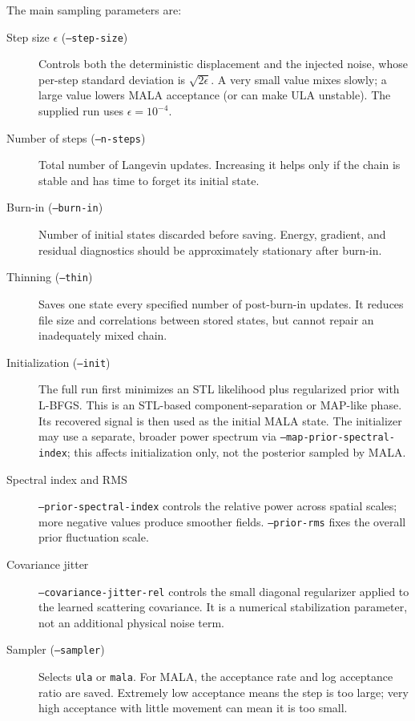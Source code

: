 \documentclass[11pt]{article}
\begin{document}
The main sampling parameters are:
\begin{description}
    \item[Step size $\epsilon$ (\texttt{--step-size})]
    Controls both the deterministic displacement and the injected noise,
    whose per-step standard deviation is $\sqrt{2\epsilon}$.  A very small
    value mixes slowly; a large value lowers MALA acceptance (or can make ULA
    unstable).  The supplied run uses $\epsilon=10^{-4}$.

    \item[Number of steps (\texttt{--n-steps})]
    Total number of Langevin updates.  Increasing it helps only if the chain is
    stable and has time to forget its initial state.

    \item[Burn-in (\texttt{--burn-in})]
    Number of initial states discarded before saving.  Energy, gradient, and
    residual diagnostics should be approximately stationary after burn-in.

    \item[Thinning (\texttt{--thin})]
    Saves one state every specified number of post-burn-in updates.  It reduces
    file size and correlations between stored states, but cannot repair an
    inadequately mixed chain.

    \item[Initialization (\texttt{--init})]
    The full run first minimizes an STL likelihood plus regularized prior with
    L-BFGS.  This is an STL-based component-separation or MAP-like phase.  Its recovered
    signal is then used as the initial MALA state.  The initializer may use a
    separate, broader power spectrum via
    \texttt{--map-prior-spectral-index}; this affects initialization only, not
    the posterior sampled by MALA.

    \item[Spectral index and RMS]
    \texttt{--prior-spectral-index} controls the relative power across spatial
    scales; more negative values produce smoother fields.
    \texttt{--prior-rms} fixes the overall prior fluctuation scale.

    \item[Covariance jitter]
    \texttt{--covariance-jitter-rel} controls the small diagonal regularizer
    applied to the learned scattering covariance.  It is a numerical
    stabilization parameter, not an additional physical noise term.

    \item[Sampler (\texttt{--sampler})]
    Selects \texttt{ula} or \texttt{mala}.  For MALA, the acceptance rate and
    log acceptance ratio are saved.  Extremely low acceptance means the step
    is too large; very high acceptance with little movement can mean it is too
    small.
\end{description}
\end{document}
